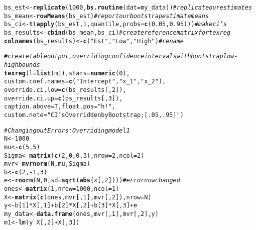\documentclass[12pt]{article}\usepackage[]{graphicx}\usepackage[]{color}
\makeatletter
\newcommand{\hlnum}[1]{\textcolor[rgb]{0.686,0.059,0.569}{#1}}%
\newcommand{\hlstr}[1]{\textcolor[rgb]{0.192,0.494,0.8}{#1}}%
\newcommand{\hlcom}[1]{\textcolor[rgb]{0.678,0.584,0.686}{\textit{#1}}}%
\newcommand{\hlopt}[1]{\textcolor[rgb]{0,0,0}{#1}}%
\newcommand{\hlstd}[1]{\textcolor[rgb]{0.345,0.345,0.345}{#1}}%
\newcommand{\hlkwb}[1]{\textcolor[rgb]{0.69,0.353,0.396}{#1}}%
\newcommand{\hlkwc}[1]{\textcolor[rgb]{0.333,0.667,0.333}{#1}}%
\newcommand{\hlkwd}[1]{\textcolor[rgb]{0.737,0.353,0.396}{\textbf{#1}}}%
\newenvironment{kframe}{%
 \def\at@end@of@kframe{}%
 \ifinner\ifhmode%
  \def\at@end@of@kframe{\end{minipage}}%
  \begin{minipage}{\columnwidth}%
 \fi\fi%
 \def\FrameCommand##1{\hskip\@totalleftmargin \hskip-\fboxsep
 \colorbox{shadecolor}{##1}\hskip-\fboxsep
     \hskip-\linewidth \hskip-\@totalleftmargin \hskip\columnwidth}%
 \MakeFramed {\advance\hsize-\width
   \@totalleftmargin\z@ \linewidth\hsize
   \@setminipage}}%
 {\par\unskip\endMakeFramed%
 \at@end@of@kframe}
\newenvironment{knitrout}{}{} %
\makeatother
\begin{document}
\begin{flushleft}
\begin{knitrout}
\begin{kframe}
\begin{alltt}
\hlstd{bs_est} \hlkwb{<-} \hlkwd{replicate}\hlstd{(}\hlnum{1000}\hlstd{,} \hlkwd{bs.routine}\hlstd{(}\hlkwc{dat} \hlstd{= my_data))} \hlcom{#replicate our estimates}
\hlstd{bs_mean} \hlkwb{<-} \hlkwd{rowMeans}\hlstd{(bs_est)} \hlcom{#report our bootstrap estimate means}
\hlstd{bs_ci} \hlkwb{<-} \hlkwd{t}\hlstd{(}\hlkwd{apply}\hlstd{(bs_est,} \hlnum{1}\hlstd{, quantile,} \hlkwc{probs} \hlstd{=} \hlkwd{c}\hlstd{(}\hlnum{0.05}\hlstd{,} \hlnum{0.95}\hlstd{)))} \hlcom{#make ci's}
\hlstd{bs_results} \hlkwb{<-} \hlkwd{cbind}\hlstd{(bs_mean, bs_ci)} \hlcom{#create reference matrix for texreg}
\hlkwd{colnames}\hlstd{(bs_results)} \hlkwb{<-} \hlkwd{c}\hlstd{(}\hlstr{"Est"}\hlstd{,} \hlstr{"Low"}\hlstd{,} \hlstr{"High"}\hlstd{)} \hlcom{#rename}

\hlcom{#create table output, overriding confidence intervals with bootstrap low-high bounds}
\hlkwd{texreg}\hlstd{(}\hlkwc{l}\hlstd{=} \hlkwd{list}\hlstd{(m1),} \hlkwc{stars} \hlstd{=} \hlkwd{numeric}\hlstd{(}\hlnum{0}\hlstd{),}
       \hlkwc{custom.coef.names} \hlstd{=} \hlkwd{c}\hlstd{(}\hlstr{"Intercept"}\hlstd{,} \hlstr{"x_1"}\hlstd{,} \hlstr{"x_2"}\hlstd{),}
       \hlkwc{override.ci.low} \hlstd{=} \hlkwd{c}\hlstd{(bs_results[,} \hlnum{2}\hlstd{]),}
       \hlkwc{override.ci.up} \hlstd{=} \hlkwd{c}\hlstd{(bs_results[,} \hlnum{3}\hlstd{]),}
       \hlkwc{caption.above} \hlstd{= T,} \hlkwc{float.pos} \hlstd{=} \hlstr{"h!"}\hlstd{,}
       \hlkwc{custom.note} \hlstd{=} \hlstr{"CI's Overridden by Bootstrap; [.05, .95]"}\hlstd{)}


\hlcom{#Changing out Errors: Overriding model 1}
\hlstd{N} \hlkwb{<-} \hlnum{1000}
\hlstd{mu} \hlkwb{<-} \hlkwd{c}\hlstd{(}\hlnum{5}\hlstd{,}\hlnum{5}\hlstd{)}
\hlstd{Sigma} \hlkwb{<-} \hlkwd{matrix}\hlstd{(} \hlkwd{c}\hlstd{(}\hlnum{2}\hlstd{,} \hlnum{0}\hlstd{,} \hlnum{0}\hlstd{,} \hlnum{3}\hlstd{),} \hlkwc{nrow} \hlstd{=} \hlnum{2}\hlstd{,} \hlkwc{ncol}\hlstd{=} \hlnum{2}\hlstd{)}
\hlstd{mvr} \hlkwb{<-} \hlkwd{mvrnorm}\hlstd{(N, mu, Sigma)}
\hlstd{b} \hlkwb{<-} \hlkwd{c}\hlstd{(}\hlnum{2}\hlstd{,} \hlopt{-}\hlnum{1}\hlstd{,} \hlnum{3}\hlstd{)}
\hlstd{e} \hlkwb{<-} \hlkwd{rnorm}\hlstd{(N,} \hlnum{0}\hlstd{,} \hlkwc{sd}\hlstd{=}\hlkwd{sqrt}\hlstd{(}\hlkwd{abs}\hlstd{(x[,}\hlnum{2}\hlstd{])))} \hlcom{#error now changed}
\hlstd{ones} \hlkwb{<-} \hlkwd{matrix}\hlstd{(}\hlnum{1}\hlstd{,} \hlkwc{nrow}\hlstd{=}\hlnum{1000}\hlstd{,} \hlkwc{ncol}\hlstd{=}\hlnum{1}\hlstd{)}
\hlstd{X} \hlkwb{<-} \hlkwd{matrix}\hlstd{(}\hlkwd{c}\hlstd{(ones, mvr[,}\hlnum{1}\hlstd{], mvr[,}\hlnum{2}\hlstd{]),} \hlkwc{nrow}\hlstd{=N)}
\hlstd{y} \hlkwb{<-} \hlstd{b[}\hlnum{1}\hlstd{]}\hlopt{*}\hlstd{X[,}\hlnum{1}\hlstd{]}\hlopt{+} \hlstd{b[}\hlnum{2}\hlstd{]}\hlopt{*}\hlstd{X[,}\hlnum{2}\hlstd{]}\hlopt{+} \hlstd{b[}\hlnum{3}\hlstd{]}\hlopt{*}\hlstd{X[,}\hlnum{3}\hlstd{]} \hlopt{+} \hlstd{e}
\hlstd{my_data} \hlkwb{<-} \hlkwd{data.frame}\hlstd{(ones, mvr[,}\hlnum{1}\hlstd{], mvr[,}\hlnum{2}\hlstd{], y)}
\hlstd{m1} \hlkwb{<-} \hlkwd{lm}\hlstd{(y} \hlopt{~} \hlstd{X[,}\hlnum{2}\hlstd{]} \hlopt{+} \hlstd{X[,}\hlnum{3}\hlstd{])}


\end{alltt}
\end{kframe}
\end{knitrout}
\end{flushleft}
\end{document}
